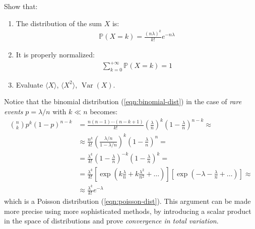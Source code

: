 \documentclass[../template.tex]{subfiles}
\begin{document}
\begin{exo}
\begin{enumerate}[label=\alph*.]
        Show that:
        \begin{enumerate}[label=\roman*.]
            \item The distribution of the sum $X$ is:
            \begin{align*}
                \mathbb{P}(X=k) = \frac{(n \lambda)^k}{k!} e^{-n \lambda} 
            \end{align*}
            \item It is properly normalized:
            \begin{align*}
                \sum_{k=0}^{+\infty} \mathbb{P}(X=k) = 1
            \end{align*}
            \item Evaluate $\langle X \rangle$, $\langle X^2 \rangle$, $\operatorname{Var}(X)$. 
        \end{enumerate}
    \end{enumerate}

    Notice that the binomial distribution (\ref{eqn:binomial-dist}) in the case of \textit{rare events} $p=\lambda/n$ with $k \ll n$ becomes:
    \begin{align*}
        {n\choose k} p^k(1-p)^{n-k} &= \frac{n(n-1)\cdots (n-k+1)}{k!} \left(\frac{\lambda}{n} \right)^k \left(1-\frac{\lambda}{n} \right)^{n-k} \approx\\
        &\approx \frac{n^k}{k!} \left(\frac{\lambda/n}{1 - \lambda/n} \right)^k \left(1-\frac{\lambda}{n} \right)^n =\\
        &= \frac{\lambda^k}{k!}\left(1-\frac{\lambda}{n} \right)^{-k} \left(1-\frac{\lambda}{n} \right)^k =\\
        &=\frac{\lambda^k}{k!}\left[\exp\left(k \frac{\lambda}{n}+k \frac{\lambda^2}{n^2} + \dots \right) \right] \left[\exp\left(-\lambda -\frac{\lambda}{n} + \dots \right)\right] \approx\\
        &\approx \frac{\lambda^k}{k!} e^{-\lambda} 
    \end{align*} 
    which is a Poisson distribution (\ref{eqn:poisson-dist}). This argument can be made more precise using more sophisticated methods, by introducing a scalar product in the space of distributions and prove \textit{convergence in total variation}.
    
\end{exo}
\end{document}
